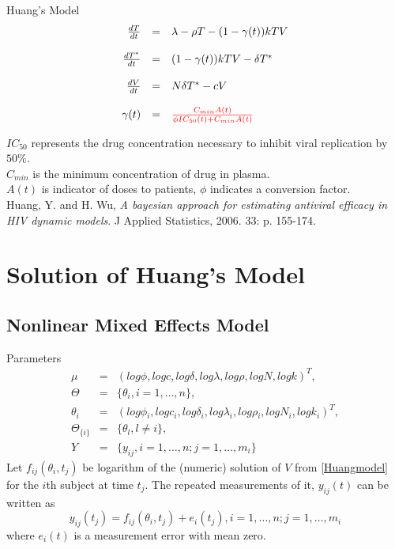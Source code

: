\documentclass[9pt]{beamer}
\begin{document}
\begin{frame}{Huang's Model}
\begin{equation}
\begin{array}{rcl}
\frac{dT}{dt} & = & \lambda{}-\rho{}T-(1-\gamma{}(t))kTV \\ \\
\frac{dT^{*}}{dt} & = & (1-\gamma{}(t))kTV-\delta{}T^{*} \\ \\
\frac{dV}{dt} & = & N\delta{}T^{*}-cV \\ \\
\gamma{}(t) & = & {\color{red}\frac{C_{min}A(t)}{\phi{}IC_{50}(t)+C_{min}A(t)}} \label{Huangmodel}
\end{array}
\end{equation}

$IC_{50}$ represents the drug concentration necessary to inhibit viral replication by $50\%$. \\
$C_{min}$ is the minimum concentration of drug in plasma. \\
$A(t)$ is indicator of doses to patients, $\phi$ indicates a conversion factor. \\
Huang, Y. and H. Wu, 
\emph{A bayesian approach for estimating antiviral efficacy in HIV dynamic models}. 
J Applied Statistics, 2006. 33: p. 155-174.
\end{frame}

\section[Solution of Huang's Model]{Solution of Huang's Model}
\subsection{Nonlinear Mixed Effects Model}
\begin{frame}{Parameters}
\begin{equation}
\begin{array}{rcl}
\mu & = & (log\phi{},logc,log\delta{},log\lambda{},log\rho{},logN,logk)^{T}, \\
\Theta & = & \{\theta_{i},i=1,\ldots,n\}, \\
\theta_{i} & = & (log\phi{}_{i},logc_{i},log\delta{}_{i},log\lambda{}_{i},log\rho{}_{i},logN_{i},logk_{i})^{T}, \\
\Theta_{\{i\}} & = & \{\theta_{l},l\neq{}i\}, \\
Y & = & \{y_{ij},i=1,\ldots,n;j=1,\ldots,m_{i}\}
\end{array}
\end{equation}
Let $f_{ij}(\theta_{i},t_{j})$ be logarithm of the (numeric) solution of $V$ from \eqref{Huangmodel} for the $i$th subject at time $t_j$. The repeated measurements of it, $y_{ij}(t)$ can be written as
\begin{equation}
y_{ij}(t_{j})=f_{ij}(\theta_{i},t_{j})+e_{i}(t_{j}), i=1,\ldots,n;j=1,\ldots,m_{i}
\end{equation}
where $e_{i}(t)$ is a measurement error with mean zero. 
\end{frame}
\end{document}
